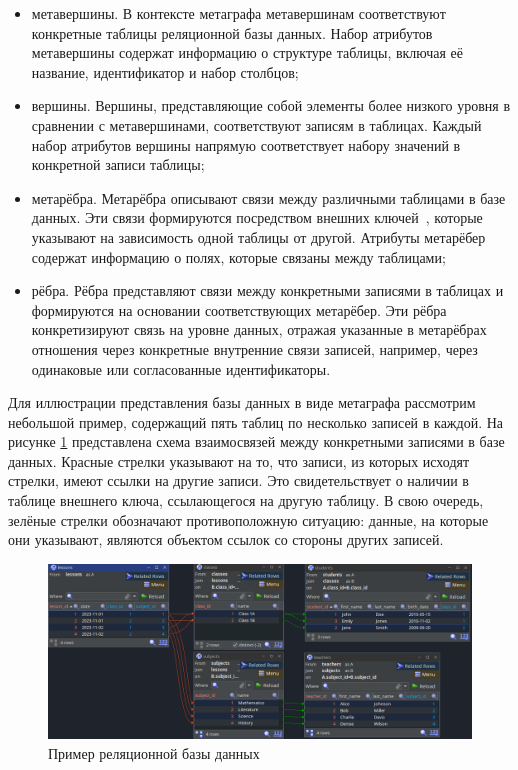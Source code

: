 \begin{itemize}
  \item метавершины. В контексте метаграфа метавершинам соответствуют конкретные таблицы реляционной базы данных. Набор атрибутов метавершины содержат информацию о структуре таблицы, включая её название, идентификатор и набор столбцов;

  \item вершины. Вершины, представляющие собой элементы более низкого уровня в сравнении с метавершинами, соответствуют записям в таблицах. Каждый набор атрибутов вершины напрямую соответствует набору значений в конкретной записи таблицы;

  \item метарёбра. Метарёбра описывают связи между различными таблицами в базе данных. Эти связи формируются посредством внешних ключей~\cite{foreign-key}, которые указывают на зависимость одной таблицы от другой. Атрибуты метарёбер содержат информацию о полях, которые связаны между таблицами;

  \item рёбра. Рёбра представляют связи между конкретными записями в таблицах и формируются на основании соответствующих метарёбер. Эти рёбра конкретизируют связь на уровне данных, отражая указанные в метарёбрах отношения через конкретные внутренние связи записей, например, через одинаковые или согласованные идентификаторы.
\end{itemize}

Для иллюстрации представления базы данных в виде метаграфа рассмотрим небольшой пример, содержащий пять таблиц по несколько записей в каждой. На рисунке \ref{db-example} представлена схема взаимосвязей между конкретными записями в базе данных. Красные стрелки указывают на то, что записи, из которых исходят стрелки, имеют ссылки на другие записи. Это свидетельствует о наличии в таблице внешнего ключа, ссылающегося на другую таблицу. В свою очередь, зелёные стрелки обозначают противоположную ситуацию: данные, на которые они указывают, являются объектом ссылок со стороны других записей.

\begin{figure}
  \includegraphics[scale=0.5]{./img/jailer-example-db-overview.png}
  \caption{Пример реляционной базы данных}
  \label{db-example}
\end{figure}

